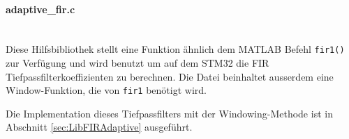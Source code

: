 \paragraph{adaptive\_fir.c}\vspace{-0.3cm}\\
Diese Hilfsbibliothek stellt eine Funktion ähnlich dem MATLAB Befehl \texttt{fir1()} zur Verfügung und wird benutzt um auf dem STM32 die FIR Tiefpassfilterkoeffizienten zu berechnen.
Die Datei beinhaltet ausserdem eine Window-Funktion, die von \texttt{fir1} benötigt wird.

Die Implementation dieses Tiefpassfilters mit der Windowing-Methode ist in Abschnitt \ref{sec:LibFIRAdaptive} ausgeführt.

